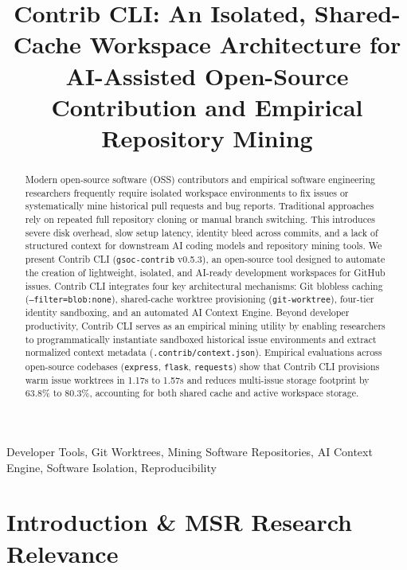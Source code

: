 \documentclass[10pt,conference]{IEEEtran}
\begin{document}
\title{Contrib CLI: An Isolated, Shared-Cache Workspace Architecture for AI-Assisted Open-Source Contribution and Empirical Repository Mining}

\author{
}

\maketitle

\begin{abstract}
Modern open-source software (OSS) contributors and empirical software engineering researchers frequently require isolated workspace environments to fix issues or systematically mine historical pull requests and bug reports. Traditional approaches rely on repeated full repository cloning or manual branch switching. This introduces severe disk overhead, slow setup latency, identity bleed across commits, and a lack of structured context for downstream AI coding models and repository mining tools. We present Contrib CLI (\texttt{gsoc-contrib} v0.5.3), an open-source tool designed to automate the creation of lightweight, isolated, and AI-ready development workspaces for GitHub issues. Contrib CLI integrates four key architectural mechanisms: Git blobless caching (\texttt{--filter=blob:none}), shared-cache worktree provisioning (\texttt{git-worktree}), four-tier identity sandboxing, and an automated AI Context Engine. Beyond developer productivity, Contrib CLI serves as an empirical mining utility by enabling researchers to programmatically instantiate sandboxed historical issue environments and extract normalized context metadata (\texttt{.contrib/context.json}). Empirical evaluations across open-source codebases (\texttt{express}, \texttt{flask}, \texttt{requests}) show that Contrib CLI provisions warm issue worktrees in 1.17s to 1.57s and reduces multi-issue storage footprint by 63.8\% to 80.3\%, accounting for both shared cache and active workspace storage.
\end{abstract}

\begin{IEEEkeywords}
Developer Tools, Git Worktrees, Mining Software Repositories, AI Context Engine, Software Isolation, Reproducibility
\end{IEEEkeywords}

\section{Introduction \& MSR Research Relevance}
\end{document}
